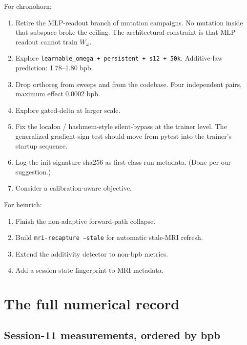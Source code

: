 \documentclass[11pt,openany]{book}
\begin{document}
For chronohorn:

\begin{enumerate}
  \item Retire the MLP-readout branch of mutation campaigns. No
  mutation inside that subspace broke the ceiling. The architectural
  constraint is that MLP readout cannot train $W_\omega$.
  \item Explore \texttt{learnable\_omega + persistent + s12 + 50k}.
  Additive-law prediction: 1.78--1.80 bpb.
  \item Drop orthoreg from sweeps and from the codebase. Four
  independent pairs, maximum effect 0.0002 bpb.
  \item Explore gated-delta at larger scale.
  \item Fix the localon / hashmem-style silent-bypass at the trainer
  level. The generalized gradient-sign test should move from pytest
  into the trainer's startup sequence.
  \item Log the init-signature sha256 as first-class run metadata.
  (Done per our suggestion.)
  \item Consider a calibration-aware objective.
\end{enumerate}

For heinrich:

\begin{enumerate}
  \item Finish the non-adaptive forward-path collapse.
  \item Build \texttt{mri-recapture --stale} for automatic stale-MRI
  refresh.
  \item Extend the additivity detector to non-bpb metrics.
  \item Add a session-state fingerprint to MRI metadata.
\end{enumerate}

\appendix

\chapter{The full numerical record}

\section{Session-11 measurements, ordered by bpb}
\end{document}

